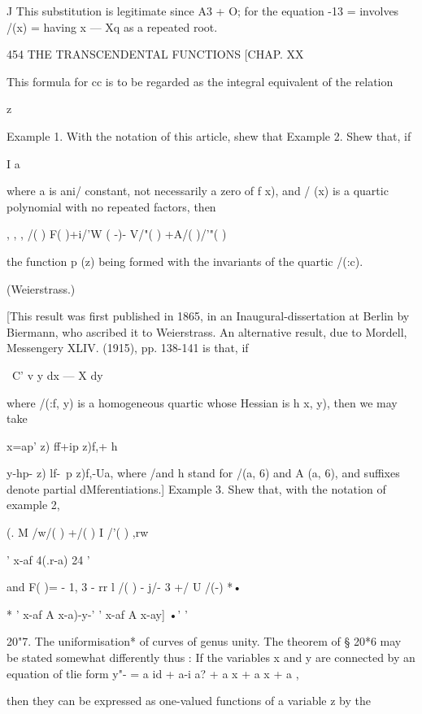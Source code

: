 {J This substitution is legitimate since A3 + O; for the equation  -13 = involves /(x) = 
having x — Xq as a repeated root. 



454 THE TRANSCENDENTAL FUNCTIONS [CHAP. XX 

This formula for cc is to be regarded as the integral equivalent of the 
relation 



z 



Example 1. With the notation of this article, shew that 
Example 2. Shew that, if 



I a 



where a is ani/ constant, not necessarily a zero of f x), and / (x) is a quartic polynomial 
with no repeated factors, then 

, , ,  /( )  F( )+i/'W  ( -)- V/"( ) +A/( )/'"( ) 

the function p (z) being formed with the invariants of the quartic /(:c). 

(Weierstrass.) 

[This result was first published in 1865, in an Inaugural-dissertation at Berlin by 
Biermann, who ascribed it to Weierstrass. An alternative result, due to Mordell, Messengery 
XLIV. (1915), pp. 138-141 is that, if 

\  C' v y dx — X dy 

where /(:f, y) is a homogeneous quartic whose Hessian is h  x, y), then we may take 

x=ap' z) ff+ip z)f,+ h  

y-hp- z) lf-\ p z)f,-Ua, 
where /and h stand for /(a, 6) and A (a, 6), and suffixes denote partial dMferentiations.] 
Example 3. Shew that, with the notation of example 2, 

(. M  /w/( )  +/( ) I /'( ) ,rw 

 '   x-af 4(.r-a) 24 ' 

and F( )= - 1, 3 - rr l /( )   - j/- 3 +/ U  /(-) *• 

* '   x-af A x-a)-y-' '   x-af A x-ay]  •'  ' 

20"7. The uniformisation* of curves of genus unity. 
The theorem of § 20*6 may be stated somewhat differently thus : 
If the variables x and y are connected by an equation of tlie form 
y"- = a id  +  a-i a? +  a x  +  a x + a , 

then they can be expressed as one-valued functions of a variable z by the 

}
